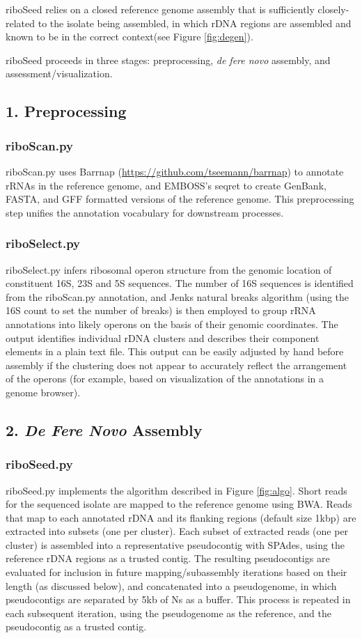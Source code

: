 \documentclass[10pt]{article}
\begin{document}
\begin{linenumbers}
riboSeed relies on a closed reference genome assembly that is sufficiently closely-related to the isolate being assembled, in which rDNA regions are assembled and known to be in the correct context(see Figure \ref{fig:degen}).

riboSeed proceeds in three stages: preprocessing, \textit{de fere novo} assembly, and assessment/visualization.
\subsection*{1. Preprocessing}
\subsubsection*{riboScan.py}
riboScan.py uses Barrnap (\url{https://github.com/tseemann/barrnap}) to annotate rRNAs in the reference genome, and EMBOSS's seqret\cite{Rice2000a} to create GenBank, FASTA, and GFF formatted versions of the reference genome. This preprocessing step unifies the annotation vocabulary for downstream processes.

\subsubsection*{riboSelect.py}
riboSelect.py infers ribosomal operon structure from the genomic location of constituent 16S, 23S and 5S sequences. The number of 16S sequences is identified from the riboScan.py annotation, and Jenks natural breaks algorithm (using the 16S count to set the number of breaks) is then employed to group rRNA annotations into likely operons on the basis of their genomic coordinates. The output identifies individual rDNA clusters and describes their component elements in a plain text file. This output can be easily adjusted by hand before assembly if the clustering does not appear to accurately reflect the arrangement of the operons (for example, based on visualization of the annotations in a genome browser).

\subsection*{2. \textit{De Fere Novo} Assembly}
\subsubsection*{riboSeed.py}
riboSeed.py implements the algorithm described in Figure \ref{fig:algo}. Short reads for the sequenced isolate are mapped to the reference genome using BWA\cite{Li2009}. Reads that map to each annotated rDNA and its flanking regions (default size 1kbp) are extracted into subsets (one per cluster). Each subset of extracted reads (one per cluster) is assembled into a representative pseudocontig with SPAdes\cite{Bankevich2012}, using the reference rDNA regions as a trusted contig. The resulting pseudocontigs are evaluated for inclusion in future mapping/subassembly iterations based on their length (as discussed below), and concatenated into a pseudogenome, in which pseudocontigs are separated by 5kb of Ns as a buffer. This process is repeated in each subsequent iteration, using the pseudogenome as the reference, and the pseudocontig as a trusted contig.



\end{linenumbers}
\end{document}
